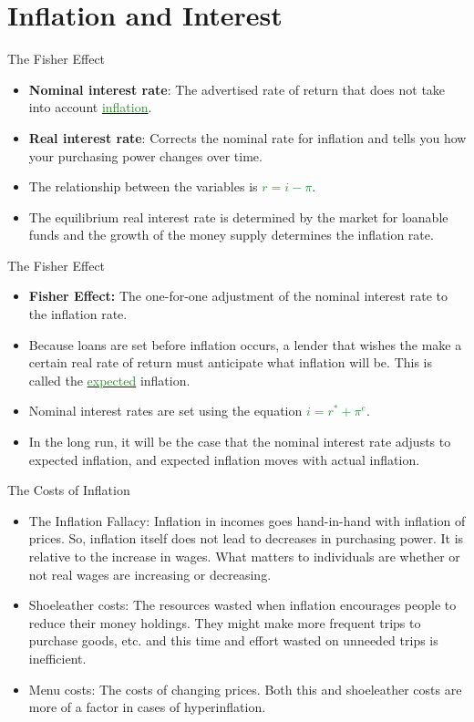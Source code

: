 \documentclass[xcolor={dvipsnames},pdf, hyperref={colorlinks=true, citecolor=ForestGreen, linkcolor=BlueViolet, urlcolor=Magenta}]{beamer}
\theoremstyle{definition}
\newcommand{\defn}[1]{\textbf{#1}}
\newcommand{\dd}[1]{{\underline{\textcolor{ForestGreen}{#1}}}}
\begin{document}
\section{Inflation and Interest}

\begin{frame}{The Fisher Effect}
\begin{itemize}
	\item \textbf{Nominal interest rate}: The advertised rate of return that does not take into account \dd{inflation}. 
	\item \textbf{Real interest rate}: Corrects the nominal rate for inflation and tells you how your purchasing power changes over time.
	\item The relationship between the variables is \dd{$r = i - \pi$}.
	\item The equilibrium real interest rate is determined by the market for loanable funds and the growth of the money supply determines the inflation rate. 
\end{itemize}
\end{frame}

\begin{frame}{The Fisher Effect}
	\begin{itemize}
		\item \defn{Fisher Effect:} The one-for-one adjustment of the nominal interest rate to the inflation rate.
		\item Because loans are set before inflation occurs, a lender that wishes the make a certain real rate of return must anticipate what inflation will be. This is called the \dd{expected} inflation. 
		\item Nominal interest rates are set using the equation \dd{$i = r^* + \pi^e$}.
		\item In the long run, it will be the case that the nominal interest rate adjusts to expected inflation, and expected inflation moves with actual inflation.
	\end{itemize}
\end{frame}

\begin{frame}{The Costs of Inflation}
	\begin{itemize}
		\item The Inflation Fallacy: Inflation in incomes goes hand-in-hand with inflation of prices. So, inflation itself does not lead to decreases in purchasing power. It is relative to the increase in wages. What matters to individuals are whether or not real wages are increasing or decreasing.
		\item Shoeleather costs: The resources wasted when inflation encourages people to reduce their money holdings. They might make more frequent trips to purchase goods, etc. and this time and effort wasted on unneeded trips is inefficient.
		\item Menu costs: The costs of changing prices. Both this and shoeleather costs are more of a factor in cases of hyperinflation.
	\end{itemize}
\end{frame}
\end{document}
